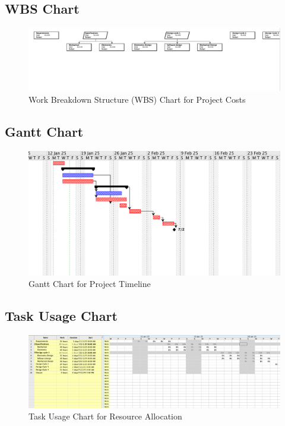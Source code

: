 \documentclass[a4paper,12pt]{article}
\begin{document}
\newpage
\subsection{WBS Chart}

\begin{figure}[H]
    \centering
    \includegraphics[width=\textwidth]{WBS_chart.png} %
    \caption{Work Breakdown Structure (WBS) Chart for Project Costs}
    \label{fig:wbs_chart}
\end{figure}


\newpage
\subsection{Gantt Chart}

\begin{figure}[H]
    \centering
    \includegraphics[width=\textwidth]{Gannt.png} %
    \caption{Gantt Chart for Project Timeline}
    \label{fig:gantt_chart}
\end{figure}


\newpage
\subsection{Task Usage Chart}

\begin{figure}[H]
    \centering
    \includegraphics[width=\textwidth]{Task_usage.png} %
    \caption{Task Usage Chart for Resource Allocation}
    \label{fig:task_usage}
\end{figure}
\end{document}
